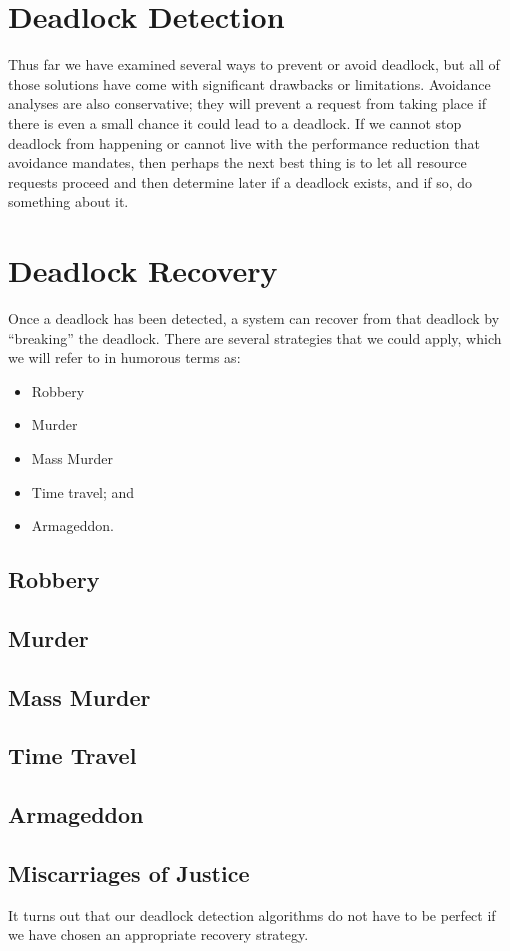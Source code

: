 




\section*{Deadlock Detection}
Thus far we have examined several ways to prevent or avoid deadlock, but all of those solutions have come with significant drawbacks or limitations. Avoidance analyses are also conservative; they will prevent a request from taking place if there is even a small chance it could lead to a deadlock. If we cannot stop deadlock from happening or cannot live with the performance reduction that avoidance mandates, then perhaps the next best thing is to let all resource requests proceed and then determine later if a deadlock exists, and if so, do something about it.

\section*{Deadlock Recovery}
Once a deadlock has been detected, a system can recover from that deadlock by ``breaking'' the deadlock. There are several strategies that we could apply, which we will refer to in humorous terms as:

\begin{itemize}
	\item Robbery
	\item Murder
	\item Mass Murder
	\item Time travel; and
	\item Armageddon.
\end{itemize}

\subsection*{Robbery}

\subsection*{Murder}

\subsection*{Mass Murder}

\subsection*{Time Travel}

\subsection*{Armageddon}

\subsection*{Miscarriages of Justice}
It turns out that our deadlock detection algorithms do not have to be perfect if we have chosen an appropriate recovery strategy. 




